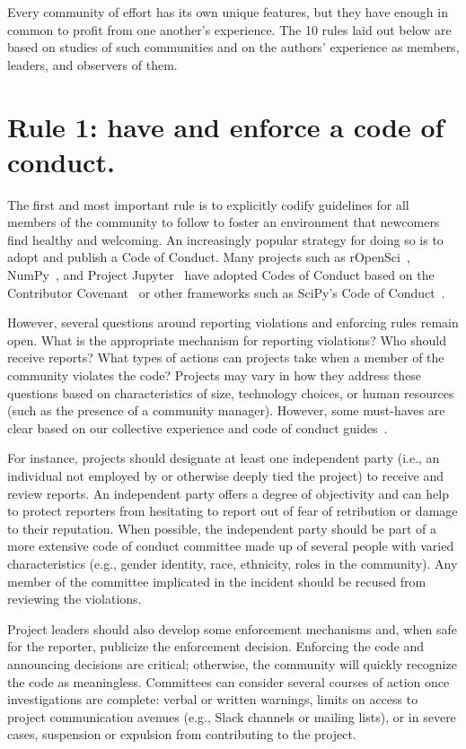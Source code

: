 \documentclass[10pt,letterpaper]{article}
\newcommand{\rulemajor}[1]{\section*{#1}}
\begin{document}
Every community of effort has its own unique features,
but they have enough in common to profit from one another's experience.
The 10 rules laid out below are based on studies of such communities
and on the authors' experience as members,
leaders,
and observers of them.

\rulemajor{Rule 1: have and enforce a code of conduct.}

The first and most important rule is
to explicitly codify guidelines for all members of the community to follow
to foster an environment that newcomers find healthy and welcoming.
An increasingly popular strategy for doing so is to adopt and publish a Code of Conduct.
Many projects such as rOpenSci~\cite{ropensci-coc},
NumPy~\cite{numpy-coc},
and Project Jupyter~\cite{jupyter-coc}
have adopted Codes of Conduct
based on the Contributor Covenant~\cite{covenant}
or other frameworks such as SciPy's Code of Conduct~\cite{scipy-coc}.

However, several questions around reporting violations and enforcing rules remain open.
What is the appropriate mechanism for reporting violations?
Who should receive reports?
What types of actions can projects take when a member of the community violates the code?
Projects may vary in how they address these questions based on characteristics of size, technology choices, or human resources
(such as the presence of a community manager).
However, some must-haves are clear based on our collective experience and code of conduct guides~\cite{aurora2019}.

For instance,
projects should designate at least one independent party
(i.e., an individual not employed by or otherwise deeply tied the project)
to receive and review reports.
An independent party offers a degree of objectivity
and can help to protect reporters from hesitating to report out of fear of retribution or damage to their reputation.
When possible,
the independent party should be part of a more extensive code of conduct committee made up of several people with varied characteristics
(e.g., gender identity, race, ethnicity, roles in the community).
Any member of the committee implicated in the incident should be recused from reviewing the violations.

Project leaders should also develop some enforcement mechanisms and,
when safe for the reporter,
publicize the enforcement decision.
Enforcing the code and announcing decisions are critical;
otherwise,
the community will quickly recognize the code as meaningless.
Committees can consider several courses of action once investigations are complete:
verbal or written warnings,
limits on access to project communication avenues (e.g., Slack channels or mailing lists),
or in severe cases,
suspension or expulsion from contributing to the project.
\end{document}

